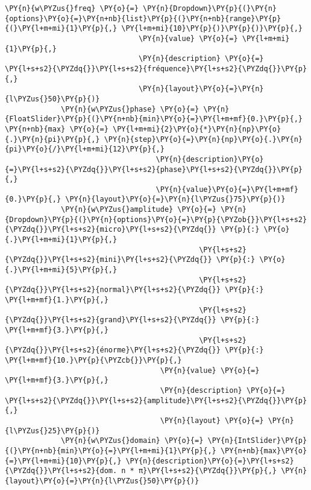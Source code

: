 \begin{Verbatim}[commandchars=\\\{\},frame=single,framerule=0.3mm,rulecolor=\color{cellframecolor}]
             \PY{n}{w\PYZus{}freq} \PY{o}{=} \PY{n}{Dropdown}\PY{p}{(}\PY{n}{options}\PY{o}{=}\PY{n+nb}{list}\PY{p}{(}\PY{n+nb}{range}\PY{p}{(}\PY{l+m+mi}{1}\PY{p}{,} \PY{l+m+mi}{10}\PY{p}{)}\PY{p}{)}\PY{p}{,}
                               \PY{n}{value} \PY{o}{=} \PY{l+m+mi}{1}\PY{p}{,}
                               \PY{n}{description} \PY{o}{=} \PY{l+s+s2}{\PYZdq{}}\PY{l+s+s2}{fréquence}\PY{l+s+s2}{\PYZdq{}}\PY{p}{,}
                               \PY{n}{layout}\PY{o}{=}\PY{n}{l\PYZus{}50}\PY{p}{)}
             \PY{n}{w\PYZus{}phase} \PY{o}{=} \PY{n}{FloatSlider}\PY{p}{(}\PY{n+nb}{min}\PY{o}{=}\PY{l+m+mf}{0.}\PY{p}{,} \PY{n+nb}{max} \PY{o}{=} \PY{l+m+mi}{2}\PY{o}{*}\PY{n}{np}\PY{o}{.}\PY{n}{pi}\PY{p}{,} \PY{n}{step}\PY{o}{=}\PY{n}{np}\PY{o}{.}\PY{n}{pi}\PY{o}{/}\PY{l+m+mi}{12}\PY{p}{,}
                                   \PY{n}{description}\PY{o}{=}\PY{l+s+s2}{\PYZdq{}}\PY{l+s+s2}{phase}\PY{l+s+s2}{\PYZdq{}}\PY{p}{,}
                                   \PY{n}{value}\PY{o}{=}\PY{l+m+mf}{0.}\PY{p}{,} \PY{n}{layout}\PY{o}{=}\PY{n}{l\PYZus{}75}\PY{p}{)}
             \PY{n}{w\PYZus{}amplitude} \PY{o}{=} \PY{n}{Dropdown}\PY{p}{(}\PY{n}{options}\PY{o}{=}\PY{p}{\PYZob{}}\PY{l+s+s2}{\PYZdq{}}\PY{l+s+s2}{micro}\PY{l+s+s2}{\PYZdq{}} \PY{p}{:} \PY{o}{.}\PY{l+m+mi}{1}\PY{p}{,}
                                             \PY{l+s+s2}{\PYZdq{}}\PY{l+s+s2}{mini}\PY{l+s+s2}{\PYZdq{}} \PY{p}{:} \PY{o}{.}\PY{l+m+mi}{5}\PY{p}{,}
                                             \PY{l+s+s2}{\PYZdq{}}\PY{l+s+s2}{normal}\PY{l+s+s2}{\PYZdq{}} \PY{p}{:} \PY{l+m+mf}{1.}\PY{p}{,}
                                             \PY{l+s+s2}{\PYZdq{}}\PY{l+s+s2}{grand}\PY{l+s+s2}{\PYZdq{}} \PY{p}{:} \PY{l+m+mf}{3.}\PY{p}{,}
                                             \PY{l+s+s2}{\PYZdq{}}\PY{l+s+s2}{énorme}\PY{l+s+s2}{\PYZdq{}} \PY{p}{:} \PY{l+m+mf}{10.}\PY{p}{\PYZcb{}}\PY{p}{,}
                                    \PY{n}{value} \PY{o}{=} \PY{l+m+mf}{3.}\PY{p}{,}
                                    \PY{n}{description} \PY{o}{=} \PY{l+s+s2}{\PYZdq{}}\PY{l+s+s2}{amplitude}\PY{l+s+s2}{\PYZdq{}}\PY{p}{,}
                                    \PY{n}{layout} \PY{o}{=} \PY{n}{l\PYZus{}25}\PY{p}{)}
             \PY{n}{w\PYZus{}domain} \PY{o}{=} \PY{n}{IntSlider}\PY{p}{(}\PY{n+nb}{min}\PY{o}{=}\PY{l+m+mi}{1}\PY{p}{,} \PY{n+nb}{max}\PY{o}{=}\PY{l+m+mi}{10}\PY{p}{,} \PY{n}{description}\PY{o}{=}\PY{l+s+s2}{\PYZdq{}}\PY{l+s+s2}{dom. n * π}\PY{l+s+s2}{\PYZdq{}}\PY{p}{,} \PY{n}{layout}\PY{o}{=}\PY{n}{l\PYZus{}50}\PY{p}{)}
         

\end{Verbatim}
